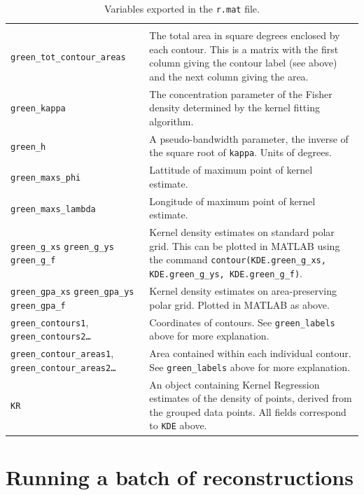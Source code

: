 \documentclass{book}
\begin{document}
\begin{table}[p]
\begin{tabularx}{\linewidth}{p{1.2in}X}
\begin{tabular}{p{1.5in}p{3in}}
      \texttt{green\_labels} relates to \texttt{green\_contours2} and
      so on. \\
      \texttt{green\_tot\_contour\_areas} & The total area in square
      degrees enclosed by each contour. This is a matrix with the
      first column giving the contour label (see above) and the
      next column giving the area. \\
      \texttt{green\_kappa} & The concentration parameter of
      the Fisher density determined by the kernel fitting algorithm. \\
      \texttt{green\_h} & A pseudo-bandwidth parameter, the inverse
      of the square root of \texttt{kappa}. Units of degrees. \\
      \texttt{green\_maxs\_phi} & Lattitude of maximum point of kernel
      estimate. \\
      \texttt{green\_maxs\_lambda} & Longitude of maximum point of kernel
      estimate. \\
      \texttt{green\_g\_xs} \texttt{green\_g\_ys} \texttt{green\_g\_f}
      & Kernel density estimates on standard polar grid. This can be
      plotted in MATLAB using the command
      \texttt{contour(KDE.green\_g\_xs, KDE.green\_g\_ys,
        KDE.green\_g\_f)}. \\
      \texttt{green\_gpa\_xs} \texttt{green\_gpa\_ys}
      \texttt{green\_gpa\_f} & Kernel density estimates on
      area-preserving polar grid. Plotted in MATLAB as above. \\
      \texttt{green\_contours1}, \texttt{green\_contours2\dots} &
      Coordinates of contours. See \texttt{green\_labels} above for
      more explanation. \\
      \texttt{green\_contour\_areas1},
      \texttt{green\_contour\_areas2\dots} & Area contained within each
      individual contour. See \texttt{green\_labels} above for more
      explanation.
    \end{tabular} \\
    \texttt{KR} & An object containing Kernel Regression estimates of the
    density of points, derived from the grouped data points. All
    fields correspond to \texttt{KDE} above.\\
    \hline
  \end{tabularx}
  \caption{Variables exported in the \texttt{r.mat} file.}
  \label{tab:matlab-export}
\end{table}



\section{Running a batch of reconstructions}
\label{manual:sec:runn-batch-reconstr}
\end{document}
